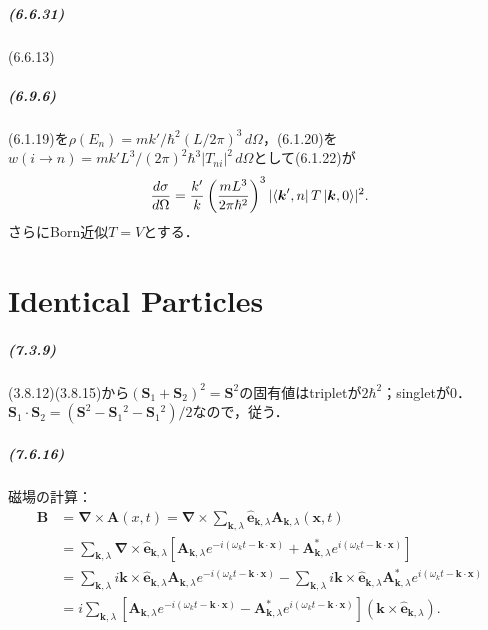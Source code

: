\documentclass[a4paper]{ltjsreport}
\begin{document}
\paragraph{(6.6.31)}
(6.6.13)

\paragraph{(6.9.6)}
(6.1.19)を$\rho(E_n) = mk'/\hbar^2(L/2\pi)^3\,d\Omega$，(6.1.20)を$w(i\to n) = mk'L^3/(2\pi)^2\hbar^3 \lvert T_{ni} \rvert^2\,d\Omega$として(6.1.22)が
\[\frac{d\sigma}{d\Omega} = \frac{k'}{k} \left(\frac{mL^3}{2\pi\hbar^2} \right)^3\lvert \bra{\boldsymbol{k}', n} T \ket{ \boldsymbol{k}, 0}  \rvert^2.\]
さらにBorn近似$T = V$とする．

\chapter{Identical Particles}
\paragraph{(7.3.9)}
(3.8.12)(3.8.15)から$(\boldsymbol{S}_1 + \boldsymbol{S}_2)^2 = \boldsymbol{S}^2$の固有値はtripletが$2\hbar^2$；singletが$0$．
$\boldsymbol{S}_1 \cdot \boldsymbol{S}_2 = (\boldsymbol{S}^2 - \boldsymbol{S}_1{}^2 - \boldsymbol{S}_1{}^2)/2$なので，従う．

\paragraph{(7.6.16)}
磁場の計算：
\begin{align*}
  \boldsymbol{B} & =  \boldsymbol{\nabla} \times \boldsymbol{A}(x, t) = \boldsymbol{\nabla} \times \sum_{\boldsymbol{k}, \lambda} \hat{\boldsymbol{e}}_{\boldsymbol{k}, \lambda} \boldsymbol{A}_{\boldsymbol{k}, \lambda}(\boldsymbol{x}, t) \\
  & =  \sum_{\boldsymbol{k}, \lambda} \boldsymbol{\nabla} \times \hat{\boldsymbol{e}}_{\boldsymbol{k}, \lambda} \left[ \boldsymbol{A}_{\boldsymbol{k}, \lambda} e^{-i(\omega_k t - \boldsymbol{k} \cdot \boldsymbol{x})} + \boldsymbol{A}^\ast_{\boldsymbol{k}, \lambda} e^{i(\omega_k t - \boldsymbol{k} \cdot \boldsymbol{x})} \right] \\
  & =  \sum_{\boldsymbol{k}, \lambda} i \boldsymbol{k} \times \hat{\boldsymbol{e}}_{\boldsymbol{k}, \lambda} \boldsymbol{A}_{\boldsymbol{k}, \lambda} e^{-i(\omega_k t - \boldsymbol{k} \cdot \boldsymbol{x})} - \sum_{\boldsymbol{k}, \lambda} i \boldsymbol{k} \times \hat{\boldsymbol{e}}_{\boldsymbol{k}, \lambda} \boldsymbol{A}^\ast_{\boldsymbol{k}, \lambda} e^{i(\omega_k t - \boldsymbol{k} \cdot \boldsymbol{x})} \\
  & =  i\sum_{\boldsymbol{k}, \lambda} \left[ \boldsymbol{A}_{\boldsymbol{k}, \lambda} e^{-i(\omega_k t - \boldsymbol{k} \cdot \boldsymbol{x})} - \boldsymbol{A}^\ast_{\boldsymbol{k}, \lambda} e^{i(\omega_k t - \boldsymbol{k} \cdot \boldsymbol{x})} \right] (\boldsymbol{k} \times \hat{\boldsymbol{e}}_{\boldsymbol{k}, \lambda}).
\end{align*}
\end{document}
